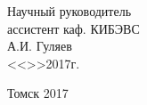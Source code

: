 \begin{titlepage}
\vfill

\begin{flushright}
\begin{minipage}{0.45\textwidth}
 \begin{flushleft}
  Научный руководитель \\
  ассистент каф. КИБЭВС \\
  \underline{\hspace{3cm}}А.И. Гуляев \\
  <<\underline{\hspace{1cm}}>>\underline{\hspace{3cm}}2017г.\\
 \end{flushleft}
\end{minipage}
\end{flushright}

\vfill

\begin{center}
Томск 2017
\end{center}
\end{titlepage}

\clearpage
